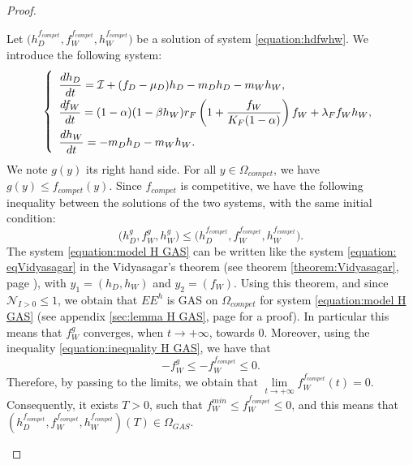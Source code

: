 \documentclass{article}
\newcommand{\lfw}{\lambda_{F}}
\newcommand{\lfw}{\lambda_{F}}
\newcommand{\cI}{\mathcal{I}}
\newcommand{\N}{\mathcal{N}}
\theoremstyle{definition}
\theoremstyle{remark}
\begin{document}
\begin{proof}
\begin{itemize}
{Let $\Big(h_D^{f_{compet}},f_W^{f_{compet}}, h_W^{f_{compet}}\Big)$ be a solution of system \eqref{equation:hdfwhw}. We introduce the following system:
\begin{equation}
\def\arraystretch{2}
\left\lbrace \begin{array}{l}
\dfrac{dh_D}{dt}= \cI + (f_D - \mu_D) h_D - m_D h_D - m_W h_W, \\
\dfrac{df_W}{dt} = (1-\alpha)(1 - \beta h_W) r_F \left(1 + \dfrac{f_W}{K_F(1-\alpha)} \right) f_W + \lfw f_W h_W, \\
\dfrac{dh_W}{dt}= -m_D h_D - m_W h_W. 
\end{array} \right.
\label{equation:model H GAS}
\end{equation}
We note $g(y)$ its right hand side. For all $y \in \Omega_{compet}$, we have $g(y) \leq f_{compet}(y)$. Since $f_{compet}$ is competitive, we have the following inequality between the solutions of the two systems, with the same initial condition:
\begin{equation}
\Big(h_D^g,f_W^g, h_W^g \Big) \leq \Big(h_D^{f_{compet}},f_W^{f_{compet}}, h_W^{f_{compet}}\Big).
\label{equation:inequality H GAS}
\end{equation}
The system \eqref{equation:model H GAS} can be written like the system \eqref{equation: eqVidyasagar} in the Vidyasagar's theorem (see theorem \ref{theorem:Vidyasagar}, page \pageref{theorem:Vidyasagar}), with $y_1 = (h_D, h_W)$ and $y_2 = (f_W)$. Using this theorem, and since $\N_{I>0} \leq 1$, we obtain that $EE^{h}$ is GAS on $\Omega_{compet}$ for system \eqref{equation:model H GAS} (see appendix \ref{sec:lemma H GAS}, page \pageref{sec:lemma H GAS} for a proof). In particular this means that $f_W^g$ converges, when $t\rightarrow +\infty$, towards $0$.
Moreover, using the inequality \eqref{equation:inequality H GAS}, we have that 
$$
-f_W^g \leq -f_W^{f_{compet}} \leq 0.
$$
Therefore, by passing to the limits, we obtain that $\lim\limits_{t\rightarrow +\infty}f_W^{f_{compet}}(t) = 0$.
Consequently, it exists $T > 0$, such that $f_W^{min} \leq f_W^{f_{compet}} \leq 0 $, and this means that $(h_D^{f_{compet}},f_W^{f_{compet}}, h_W^{f_{compet}})(T) \in \Omega_{GAS}$.}
\end{itemize}
\end{proof}
\end{document}
